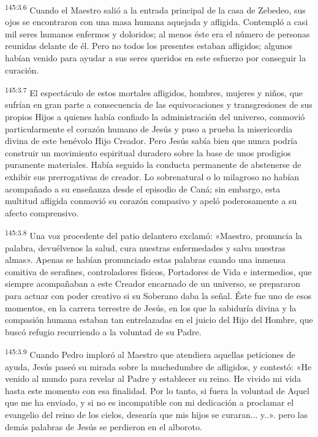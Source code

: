 \par
\textsuperscript{145:3.6} Cuando el Maestro salió a la entrada principal de la casa de Zebedeo, sus ojos se encontraron con una masa humana aquejada y afligida. Contempló a casi mil seres humanos enfermos y doloridos; al menos éste era el número de personas reunidas delante de él. Pero no todos los presentes estaban afligidos; algunos habían venido para ayudar a sus seres queridos en este esfuerzo por conseguir la curación.

\par
\textsuperscript{145:3.7} El espectáculo de estos mortales afligidos, hombres, mujeres y niños, que sufrían en gran parte a consecuencia de las equivocaciones y transgresiones de sus propios Hijos a quienes había confiado la administración del universo, conmovió particularmente el corazón humano de Jesús y puso a prueba la misericordia divina de este benévolo Hijo Creador. Pero Jesús sabía bien que nunca podría construir un movimiento espiritual duradero sobre la base de unos prodigios puramente materiales. Había seguido la conducta permanente de abstenerse de exhibir sus prerrogativas de creador. Lo sobrenatural o lo milagroso no habían acompañado a su enseñanza desde el episodio de Caná; sin embargo, esta multitud afligida conmovió su corazón compasivo y apeló poderosamente a su afecto comprensivo.

\par
\textsuperscript{145:3.8} Una voz procedente del patio delantero exclamó: «Maestro, pronuncia la palabra, devuélvenos la salud, cura nuestras enfermedades y salva nuestras almas». Apenas se habían pronunciado estas palabras cuando una inmensa comitiva de serafines, controladores físicos, Portadores de Vida e intermedios, que siempre acompañaban a este Creador encarnado de un universo, se prepararon para actuar con poder creativo si su Soberano daba la señal. Éste fue uno de esos momentos, en la carrera terrestre de Jesús, en los que la sabiduría divina y la compasión humana estaban tan entrelazadas en el juicio del Hijo del Hombre, que buscó refugio recurriendo a la voluntad de su Padre.

\par
\textsuperscript{145:3.9} Cuando Pedro imploró al Maestro que atendiera aquellas peticiones de ayuda, Jesús paseó su mirada sobre la muchedumbre de afligidos, y contestó: «He venido al mundo para revelar al Padre y establecer su reino. He vivido mi vida hasta este momento con esa finalidad. Por lo tanto, si fuera la voluntad de Aquel que me ha enviado, y si no es incompatible con mi dedicación a proclamar el evangelio del reino de los cielos, desearía que mis hijos se curaran... y..». pero las demás palabras de Jesús se perdieron en el alboroto.

